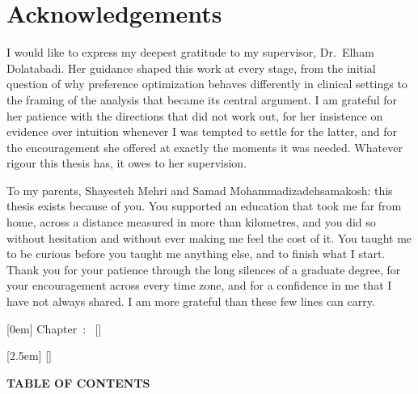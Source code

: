 \newpage
\section*{Acknowledgements}

I would like to express my deepest gratitude to my supervisor, Dr.~Elham Dolatabadi. Her guidance shaped this work at every stage, from the initial question of why preference optimization behaves differently in clinical settings to the framing of the analysis that became its central argument. I am grateful for her patience with the directions that did not work out, for her insistence on evidence over intuition whenever I was tempted to settle for the latter, and for the encouragement she offered at exactly the moments it was needed. Whatever rigour this thesis has, it owes to her supervision.

To my parents, Shayesteh Mehri and Samad Mohammadizadehsamakosh: this thesis exists because of you. You supported an education that took me far from home, across a distance measured in more than kilometres, and you did so without hesitation and without ever making me feel the cost of it. You taught me to be curious before you taught me anything else, and to finish what I start. Thank you for your patience through the long silences of a graduate degree, for your encouragement across every time zone, and for a confidence in me that I have not always shared. I am more grateful than these few lines can carry.

\setcounter{tocdepth}{2}

  [0em]
  {\bfseries}
  {\ifx\thecontentslabel\empty
    \else
      Chapter~\Numberstringnum{\thecontentslabel}:~
    \fi}
  {}
  {\contentspage}
  []

  [2.5em]
  {}
  {\thecontentslabel\quad}
  {}
  {\contentspage}
  []

\newpage
\makeatletter
\renewcommand{\tableofcontents}{%
  \cleardoublepage
  \phantomsection
  \begin{center}
    {\bfseries\MakeUppercase{Table of Contents}}
  \end{center}
  \vspace{1.25em}
}
\makeatother
\tableofcontents

